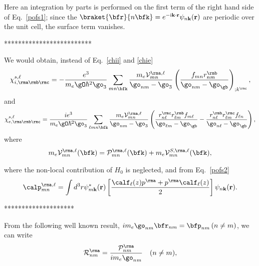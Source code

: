 Here an integration by parts is performed on the first term of the
right hand side of Eq.~\eqref{pofs1}; since the
$\braket{\bfr}{n\bfk}=e^{-\mathrm{i}\mathbf{k}\cdot\mathbf{r}}\psi_{n\mathbf{k}}(\mathbf{r})$ 
are periodic over the unit cell, the surface term vanishes. 

*************************

We would obtain,
instead of Eq.~\eqref{chii} and \eqref{chie}
\begin{equation}\label{chiinl}
\chi_{i,\rma\rmb\rmc}^{s,\ell}=-\frac{e^3}{m_e\gO\hbar^2\go_3}\sum_{mn\bfk}
\frac{m_e{\cal V}_{mn}^{\rma,\ell}}{\go_{nm}-\go_3}
\left(\frac{f_{mn}r_{nm}^{\rmb}}{\go_{nm}-\go_\gb}\right)_{;k^{\rmc}},
\end{equation}
and
\begin{equation}\label{chienl}
\chi_{e,\rma\rmb\rmc}^{s,\ell}=\frac{ie^3}{m_e\gO\hbar^2\go_3}\sum_{\ell mn\bfk}
\frac{m_e{\cal V}_{mn}^{\rma,\ell}}{\go_{nm}-\go_3}
\left(
\frac{r_{n\ell}^{\rmc} r_{\ell m}^{\rmb}
f_{m\ell}}{\go_{\ell m}-\go_\gb}
-\frac{r_{n\ell}^{\rmb} r_{\ell m}^{\rmc}
f_{\ell n}}{\go_{n \ell}-\go_\gb}
\right),
\end{equation}
where
\begin{align}\label{nl.5}
m_e{\cal V}_{mn}^{\rma,\ell}(\bfk)=
{\cal P}^{\rma,\ell}_{mn}(\bfk)
+
m_e{\cal V}^{S,\rma,\ell}_{mn}(\bfk)
,
\end{align}



where the non-local contribution of $H_0$ is neglected, and from Eq.~\eqref{pofs2}
\begin{equation}\label{calpmn}
\calp_{mn}^{\rma,\ell}=\int d^3 r
\psi^*_{m\mathbf{k}}(\mathbf{r})
\left[\frac{\calf_\ell(z) p^{\rma} +
p^{\rma} \calf_\ell(z)}{2}\right]
\psi_{n\mathbf{k}}(\mathbf{r}).
\end{equation}

********************

From the following well known result,
$im_e\go_{nm}\bfr_{nm}=\bfp_{nm}\,(n\neq m)$, 
we can write
\begin{equation}\label{rcal}
{\cal R}^{\rma}_{nm}=\frac{{\cal P}^{\rma}_{nm}}{im_e\go_{nm}}\quad(n\neq m)
,
\end{equation} 
